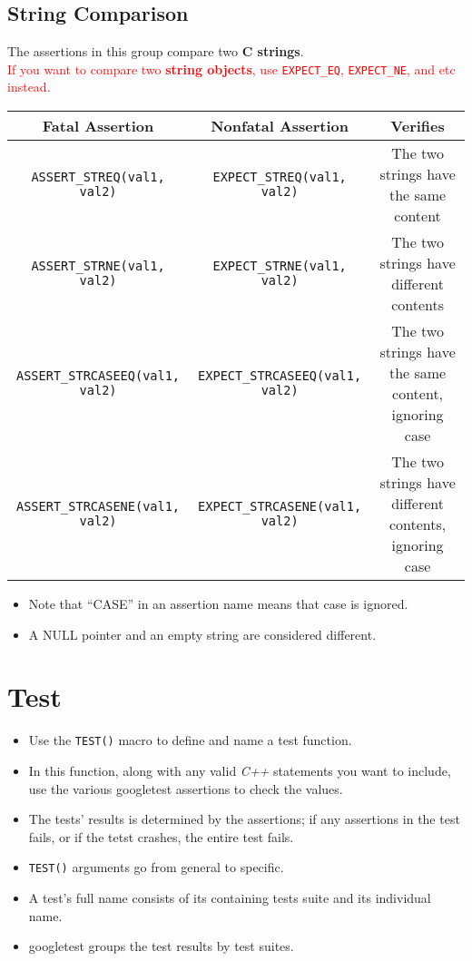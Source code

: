 \documentclass[letterpaper,11pt]{report}
\begin{document}
\subsection*{String Comparison}
The assertions in this group compare two \textbf{C strings}.\\
\textcolor{red}{If you want to compare two \textbf{string objects}, use \texttt{EXPECT\_EQ}, \texttt{EXPECT\_NE}, and etc instead.}
\begin{center}
    \footnotesize{
    \begin{tabular}{| c | c | c |}
        \hline
        \textbf{Fatal Assertion}           & \textbf{Nonfatal Assertion}     & \textbf{Verifies}     \\ \hline 
        \texttt{ASSERT\_STREQ(val1, val2)} & \texttt{EXPECT\_STREQ(val1, val2)} & The two strings have the same content \\ \hline
        \texttt{ASSERT\_STRNE(val1, val2)} & \texttt{EXPECT\_STRNE(val1, val2)} & The two strings have different contents \\ \hline
        \texttt{ASSERT\_STRCASEEQ(val1, val2)} & \texttt{EXPECT\_STRCASEEQ(val1, val2)} & The two strings have the same content, ignoring case \\ \hline
        \texttt{ASSERT\_STRCASENE(val1, val2)} & \texttt{EXPECT\_STRCASENE(val1, val2)} & The two strings have different contents, ignoring case \\ \hline
    \end{tabular}}
\end{center}
\begin{itemize}
    \item Note that ``CASE'' in an assertion name means that case is ignored.
    \item A NULL pointer and an empty string are considered different.
\end{itemize}

\section*{Test}
\begin{itemize}
    \item Use the \texttt{TEST()} macro to define and name a test function.
    \item In this function, along with any valid \textit{C++} statements you want to include, use 
        the various googletest assertions to check the values.
    \item The tests' results is determined by the assertions; if any assertions in the test fails, or
        if the tetst crashes, the entire test fails.
    \item \texttt{TEST()} arguments go from general to specific.
    \item A test's full name consists of its containing tests suite and its individual name.
    \item googletest groups the test results by test suites.
\end{itemize}
\end{document}
